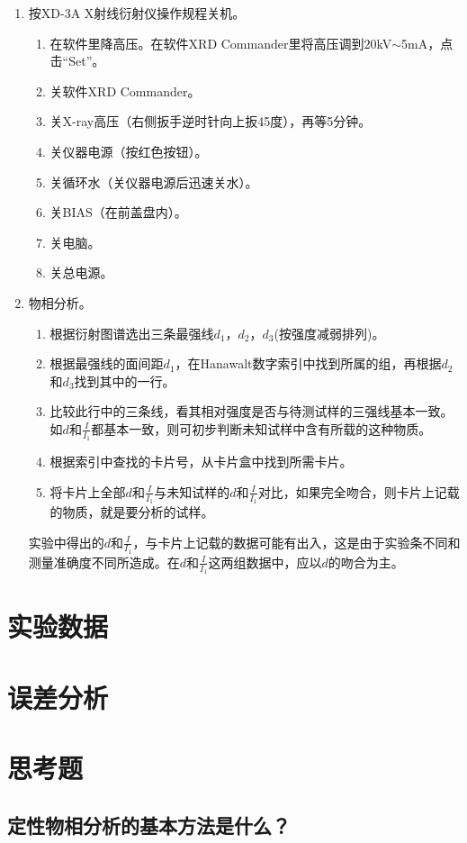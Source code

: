 \documentclass[a4paper]{article}
\begin{document}
\begin{enumerate}
\item 按XD-3A X射线衍射仪操作规程关机。
\begin{enumerate}
	\item 在软件里降高压。在软件XRD Commander里将高压调到20kV$ \sim $5mA，点击“Set”。
	\item 关软件XRD Commander。
	\item 关X-ray高压（右侧扳手逆时针向上扳45度），再等5分钟。
	\item 关仪器电源（按红色按钮）。
	\item 关循环水（关仪器电源后迅速关水）。
	\item 关BIAS（在前盖盘内）。
	\item 关电脑。
    \item 关总电源。
\end{enumerate}
\item 物相分析。
\begin{enumerate}
\item 根据衍射图谱选出三条最强线$d_1$，$d_2$，$d_3$(按强度减弱排列)。
\item 根据最强线的面间距$d_1$，在Hanawalt数字索引中找到所属的组，再根据$d_2$和$d_3$找到其中的一行。
\item 比较此行中的三条线，看其相对强度是否与待测试样的三强线基本一致。如$d$和$\frac{I}{I_1}$都基本一致，则可初步判断未知试样中含有所载的这种物质。
\item 根据索引中查找的卡片号，从卡片盒中找到所需卡片。
\item 将卡片上全部$d$和$\frac{I}{I_1}$与未知试样的$d$和$\frac{I}{I_1}$对比，如果完全吻合，则卡片上记载的物质，就是要分析的试样。
\end{enumerate}
实验中得出的$d$和$\frac{I}{I_1}$，与卡片上记载的数据可能有出入，这是由于实验条不同和测量准确度不同所造成。在$d$和$\frac{I}{I_1}$这两组数据中，应以$d$的吻合为主。
\end{enumerate}

\section{实验数据}

\section{误差分析}

\section{思考题}
\subsection*{定性物相分析的基本方法是什么？}
\end{document}
